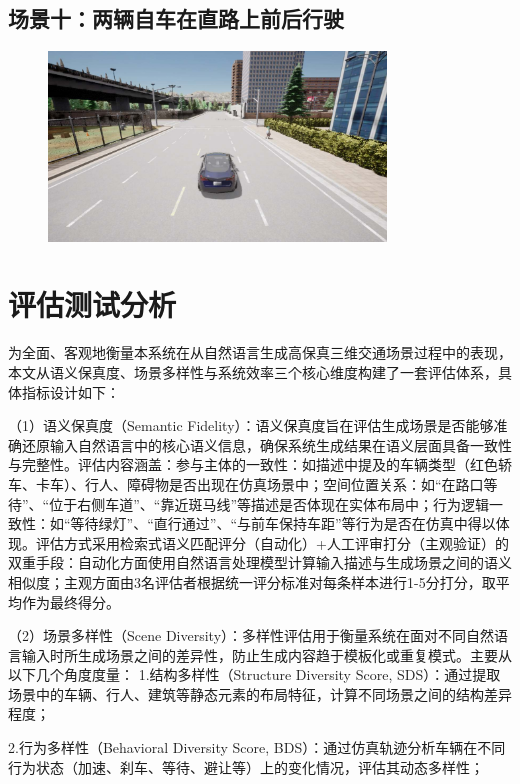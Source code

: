 \subsection {场景十：两辆自车在直路上前后行驶}
\begin{figure}[H]
	\centering
	\includegraphics[width=0.8\textwidth]{"images/场景10.pdf"}
	\caption{}
	\label{}
\end{figure}


\section{评估测试分析}
为全面、客观地衡量本系统在从自然语言生成高保真三维交通场景过程中的表现，本文从语义保真度、场景多样性与系统效率三个核心维度构建了一套评估体系，具体指标设计如下：

（1）语义保真度（Semantic Fidelity）：语义保真度旨在评估生成场景是否能够准确还原输入自然语言中的核心语义信息，确保系统生成结果在语义层面具备一致性与完整性。评估内容涵盖：参与主体的一致性：如描述中提及的车辆类型（红色轿车、卡车）、行人、障碍物是否出现在仿真场景中；空间位置关系：如“在路口等待”、“位于右侧车道”、“靠近斑马线”等描述是否体现在实体布局中；行为逻辑一致性：如“等待绿灯”、“直行通过”、“与前车保持车距”等行为是否在仿真中得以体现。评估方式采用检索式语义匹配评分（自动化）+人工评审打分（主观验证）的双重手段：自动化方面使用自然语言处理模型计算输入描述与生成场景之间的语义相似度；主观方面由3名评估者根据统一评分标准对每条样本进行1-5分打分，取平均作为最终得分。
	
（2）场景多样性（Scene Diversity）：多样性评估用于衡量系统在面对不同自然语言输入时所生成场景之间的差异性，防止生成内容趋于模板化或重复模式。主要从以下几个角度度量：
1.结构多样性（Structure Diversity Score, SDS）：通过提取场景中的车辆、行人、建筑等静态元素的布局特征，计算不同场景之间的结构差异程度；

2.行为多样性（Behavioral Diversity Score, BDS）：通过仿真轨迹分析车辆在不同行为状态（加速、刹车、等待、避让等）上的变化情况，评估其动态多样性；

